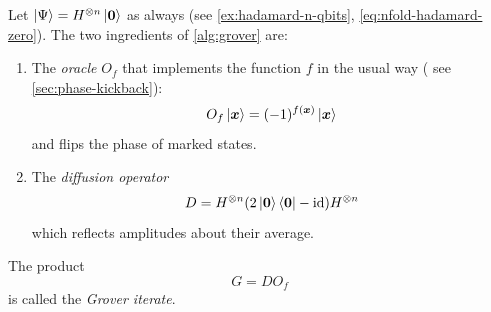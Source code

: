 
Let $\ket{\Psi} = H^{\otimes n}\ket{{\boldsymbol{0}}}$ as always (see \autoref{ex:hadamard-n-qbits}, \autoref{eq:nfold-hadamard-zero}).
The two ingredients of \autoref{alg:grover} are:
\begin{enumerate}[label=(\roman*)]
\item 
The \emph{oracle} $O_f$ that implements the function \(f\) in the usual way 
(%
see \autoref{sec:phase-kickback}):
\[
O_f\ket{{\boldsymbol{x}}}
=
(-1)^{f({\boldsymbol{x}})}\ket{{\boldsymbol{x}}}
\]
and flips the phase of marked states.

\item 
The \emph{diffusion operator} 
\[
D 
= 
H^{\otimes n}(2\ket{{\boldsymbol{0}}}\bra{{\boldsymbol{0}}}-\operatorname{id})H^{\otimes n}
\]
which reflects amplitudes about their average.
\end{enumerate}

The product
\[
G
=
DO_f
\]
is called the \emph{Grover iterate}.

